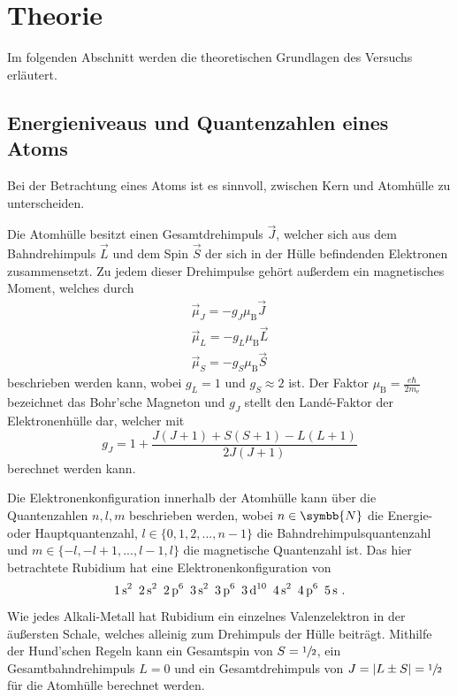 \section{Theorie}
\label{sec:theorie}

    Im folgenden Abschnitt werden die theoretischen Grundlagen des Versuchs erläutert.

\subsection{Energieniveaus und Quantenzahlen eines Atoms}
\label{sec:energieaufspaltung}

    Bei der Betrachtung eines Atoms ist es sinnvoll,
    zwischen Kern und Atomhülle zu unterscheiden.

    Die Atomhülle besitzt einen Gesamtdrehimpuls $\vec{J}$,
    welcher sich aus dem Bahndrehimpuls $\vec{L}$ und dem Spin $\vec{S}$ der sich in der Hülle befindenden Elektronen zusammensetzt.
    Zu jedem dieser Drehimpulse gehört außerdem ein magnetisches Moment,
    welches durch
    \begin{gather*}
        \vec{\mu}_J = -g_J \mu_\text{B} \vec{J} \\
        \vec{\mu}_L = -g_L \mu_\text{B} \vec{L} \\
        \vec{\mu}_S = -g_S \mu_\text{B} \vec{S}
    \end{gather*}
    beschrieben werden kann,
    wobei $g_L = 1$ und $g_S \approx 2$ ist.
    Der Faktor $\mu_\text{B} = \frac{e \hbar}{2m_\text{e}}$ bezeichnet das Bohr'sche Magneton und $g_J$ stellt den Landé-Faktor der Elektronenhülle dar,
    welcher mit
    \begin{equation}
        g_J = 1 + \frac{J(J+1) + S(S+1) - L(L+1)}{2J(J+1)}
        \label{eqn:landeJ}
    \end{equation}
    berechnet werden kann.

    Die Elektronenkonfiguration innerhalb der Atomhülle kann über die Quantenzahlen $n, l, m$ beschrieben werden,
    wobei $n \in \symbb{N}$ die Energie- oder Hauptquantenzahl,
    $l \in \{0, 1, 2, ..., n-1\}$ die Bahndrehimpulsquantenzahl und $m \in \{-l, -l+1, ..., l-1, l\}$ die magnetische Quantenzahl ist.
    Das hier betrachtete Rubidium hat eine Elektronenkonfiguration von
    \[
        \ce{1s^2 \, 2s^2 \, 2p^6 \, 3s^2 \, 3p^6 \, 3d^10 \, 4s^2 \, 4p^6 \, 5s} \ .
    \]
    Wie jedes Alkali-Metall hat Rubidium ein einzelnes Valenzelektron in der äußersten Schale,
    welches alleinig zum Drehimpuls der Hülle beiträgt.
    Mithilfe der Hund'schen Regeln kann ein Gesamtspin von $S = \sfrac{1}{2}$,
    ein Gesamtbahndrehimpuls $L=0$ und ein Gesamtdrehimpuls von $J = \lvert L \pm S \rvert = \sfrac{1}{2}$ für die Atomhülle berechnet werden.

